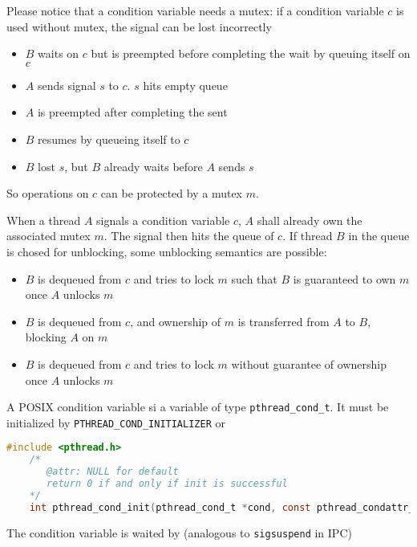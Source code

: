 
Please notice that a condition variable needs a mutex: if a condition variable $c$ is used without mutex, the signal can be lost incorrectly
\begin{itemize}
    \item $B$ waits on $c$ but is preempted before completing the wait by queuing itself on $c$
    \item $A$ sends signal $s$ to $c$. $s$ hits empty queue
    \item $A$ is preempted after completing the sent
    \item $B$ resumes by queueing itself to $c$
    \item $B$ lost $s$, but $B$ already waits before $A$ sends $s$
\end{itemize}
So operations on $c$ can be protected by a mutex $m$.

When a thread $A$ signals a condition variable $c$, $A$ shall already own the associated mutex $m$.
The signal then hits the queue of $c$. If thread $B$ in the queue is chosed for unblocking, some unblocking semantics are possible:
\begin{itemize}
    \item $B$ is dequeued from $c$ and tries to lock $m$ such that $B$ is guaranteed to own $m$ once $A$ unlocks $m$
    \item $B$ is dequeued from $c$, and ownership of $m$ is transferred from $A$ to $B$, blocking $A$ on $m$
    \item $B$ is dequeued from $c$ and tries to lock $m$ without guarantee of ownership once $A$ unlocks $m$
\end{itemize}

A POSIX condition variable si a variable of type \texttt{pthread\_cond\_t}. It must be initialized by \texttt{PTHREAD\_COND\_INITIALIZER} or 
\begin{lstlisting}[language=C]
    #include <pthread.h>
    /*
       @attr: NULL for default
       return 0 if and only if init is successful
    */
    int pthread_cond_init(pthread_cond_t *cond, const pthread_condattr_t *attr); 
\end{lstlisting}
The condition variable is waited by (analogous to \texttt{sigsuspend} in IPC)

